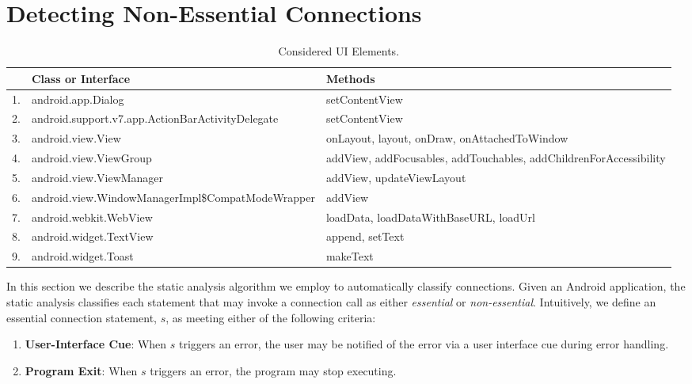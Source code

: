 \section{Detecting Non-Essential Connections}
\label{sec:analysis}

\begin{table}[t]
\renewcommand*{\arraystretch}{1.3}
\caption{Considered UI Elements.}
\label{tbl:ui}
\centering
\tabcolsep=1.5pt
\begin{tabular}{|l|P{3.5cm}|P{3.8cm}|}
\hline
& \textbf{Class or Interface} & \textbf{Methods} \\
. & android.app.Dialog                                 & setContentView \\
2. & android.support.v7.app.\newline{}ActionBarActivityDelegate   & setContentView \\
3. & android.view.View                                  & onLayout, layout, onDraw, onAttachedToWindow \\
4. & android.view.ViewGroup                             & addView, addFocusables, addTouchables, addChildrenForAccessibility \\
5. & android.view.ViewManager                           & addView, updateViewLayout \\
6. & android.view.\newline{}WindowManagerImpl\newline{}\$CompatModeWrapper  & addView \\
7. & android.webkit.WebView                             & loadData, loadDataWithBaseURL, loadUrl \\
8. & android.widget.TextView       & append, setText \\
9. & android.widget.Toast        & makeText \\
\hline
\end{tabular}
\end{table}

In this section we describe the static analysis algorithm we employ to
automatically classify connections.  Given an Android application, the
static analysis classifies each statement that may invoke a
connection call as either {\it essential} or {\it non-essential}.
Intuitively, we define an essential connection statement, $s$, as
meeting either of the following criteria:

\begin{enumerate}
\item{\bf User-Interface Cue}: When $s$ triggers an error, the user
may be notified of the error via a user interface cue during error
handling.
\item {\bf Program Exit}: When $s$ triggers an error, the program 
   may stop executing.  
\end{enumerate}

